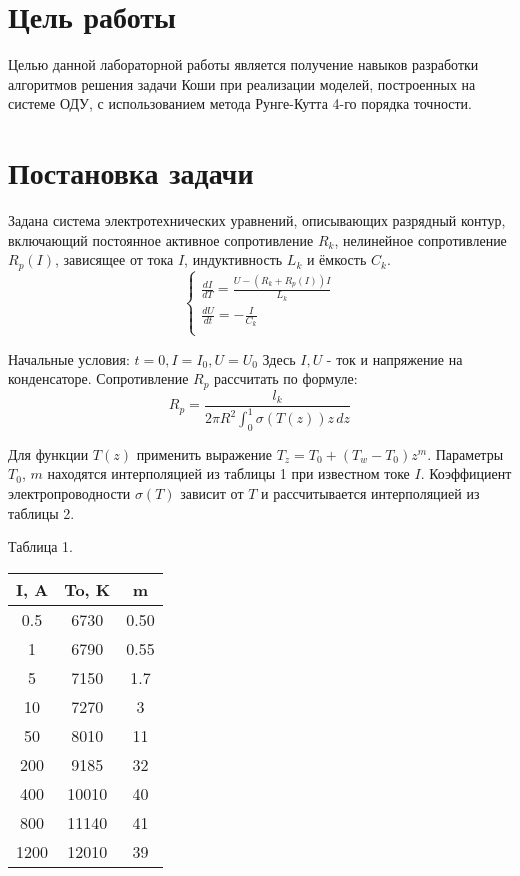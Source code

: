 
\section*{Цель работы}
Целью данной лабораторной работы является получение навыков разработки алгоритмов решения задачи Коши при реализации моделей, построенных на системе ОДУ, с использованием метода Рунге-Кутта 4-го порядка точности.






\section*{Постановка задачи}
Задана система электротехнических уравнений, описывающих разрядный контур, включающий постоянное активное сопротивление $R_k$, нелинейное сопротивление $R_p(I)$, зависящее от тока $I$, индуктивность $L_k$ и ёмкость $C_k$.
$$
\left\{\begin{matrix}
	\frac{dI}{dT} = \frac{U - (R_k + R_p(I))I}{L_k} \\ 
	\frac{dU}{dt} = -\frac{I}{C_k}\\
\end{matrix}\right.
$$

Начальные условия: $t = 0,I = I_0,U = U_0$ Здесь $I, U$ - ток и напряжение на конденсаторе. Сопротивление $R_p$ рассчитать по формуле:
$$
R_p = \frac{l_k}{2\pi R^2 \int_{0}^{1} \sigma (T(z))z\,dz }
$$

Для функции $T(z)$ применить выражение $T_z = T_0+ (T_w - T_0)z^m$. Параметры $T_0$, $m$ находятся интерполяцией из таблицы 1 при известном токе $I$. Коэффициент электропроводности $\sigma(T)$ зависит от $T$ и рассчитывается интерполяцией из таблицы 2.

\newpage



\begin{center}
	Таблица 1. \\
	\begin{tabular}{ |c|c|c| }
		\hline
		I, A & To, K & m \\ \hline
		0.5 & 6730 & 0.50 \\
		1 & 6790 & 0.55 \\
		5 & 7150 & 1.7 \\
		10 & 7270 & 3 \\
		50 & 8010 & 11 \\
		200 & 9185 & 32 \\
		400 & 10010 & 40 \\
		800 & 11140 & 41 \\
		1200 & 12010 & 39 \\
		\hline
	\end{tabular}
\end{center}



